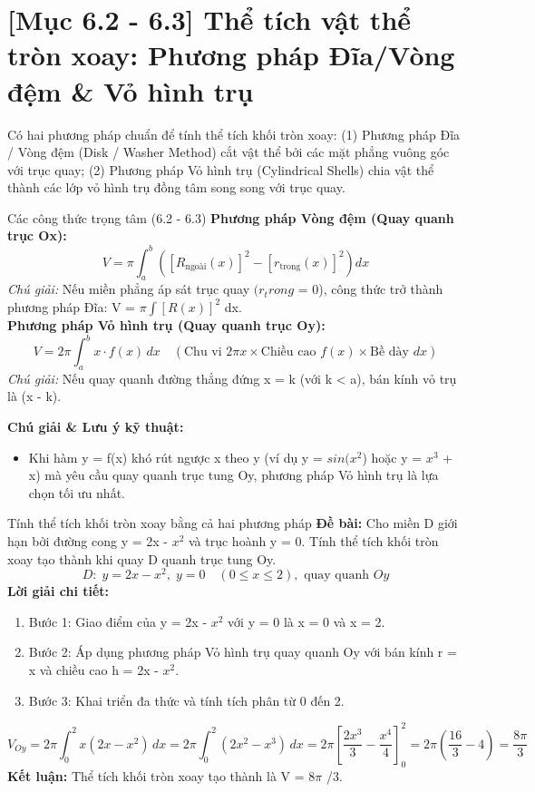 \documentclass[11pt,a4paper,oneside]{book}
\begin{document}
\section{[Mục 6.2 - 6.3] Thể tích vật thể tròn xoay: Phương pháp Đĩa/Vòng đệm \& Vỏ hình trụ}
Có hai phương pháp chuẩn để tính thể tích khối tròn xoay: (1) Phương pháp Đĩa / Vòng đệm (Disk / Washer Method) cắt vật thể bởi các mặt phẳng vuông góc với trục quay; (2) Phương pháp Vỏ hình trụ (Cylindrical Shells) chia vật thể thành các lớp vỏ hình trụ đồng tâm song song với trục quay.

\begin{congthuc}{Các công thức trọng tâm (6.2 - 6.3)}
\noindent\textbf{Phương pháp Vòng đệm (Quay quanh trục Ox):}
\[ V = \pi \int_a^b \left( [R_{\text{ngoài}}(x)]^2 - [r_{\text{trong}}(x)]^2 \right) dx \]
\noindent\textit{Chú giải:} Nếu miền phẳng áp sát trục quay $(r_trong$ = 0), công thức trở thành phương pháp Đĩa: V = $\pi \int [R(x)]^2$ dx.\\[4pt]
\noindent\textbf{Phương pháp Vỏ hình trụ (Quay quanh trục Oy):}
\[ V = 2\pi \int_a^b x \cdot f(x)\,dx \quad \left(\text{Chu vi } 2\pi x \times \text{Chiều cao } f(x) \times \text{Bề dày } dx\right) \]
\noindent\textit{Chú giải:} Nếu quay quanh đường thẳng đứng x = k (với k < a), bán kính vỏ trụ là (x - k).\\[4pt]
\end{congthuc}

\noindent\textbf{Chú giải \& Lưu ý kỹ thuật:}
\begin{itemize}[leftmargin=1.5em, itemsep=2pt]
  \item Khi hàm y = f(x) khó rút ngược x theo y (ví dụ y = $sin(x^2$) hoặc y = $x^3$ + x) mà yêu cầu quay quanh trục tung Oy, phương pháp Vỏ hình trụ là lựa chọn tối ưu nhất.
\end{itemize}

\begin{vidu}{Tính thể tích khối tròn xoay bằng cả hai phương pháp}
\textbf{Đề bài:} Cho miền D giới hạn bởi đường cong y = 2x - $x^2$ và trục hoành y = 0. Tính thể tích khối tròn xoay tạo thành khi quay D quanh trục tung Oy.
\[ D: \; y = 2x - x^2, \; y = 0 \quad (0 \le x \le 2), \text{ quay quanh } Oy \]
\textbf{Lời giải chi tiết:}
\begin{enumerate}[leftmargin=1.5em, itemsep=2pt]
  \item Bước 1: Giao điểm của y = 2x - $x^2$ với y = 0 là x = 0 và x = 2.
  \item Bước 2: Áp dụng phương pháp Vỏ hình trụ quay quanh Oy với bán kính r = x và chiều cao h = 2x - $x^2$.
  \item Bước 3: Khai triển đa thức và tính tích phân từ 0 đến 2.
\end{enumerate}
\[ V_{Oy} = 2\pi \int_0^2 x(2x - x^2)\,dx = 2\pi \int_0^2 (2x^2 - x^3)\,dx = 2\pi \left[\frac{2x^3}{3} - \frac{x^4}{4}\right]_0^2 = 2\pi\left(\frac{16}{3} - 4\right) = \frac{8\pi}{3} \]
\noindent\textbf{Kết luận:} Thể tích khối tròn xoay tạo thành là V = 8$\pi$ /3.
\end{vidu}
\end{document}
